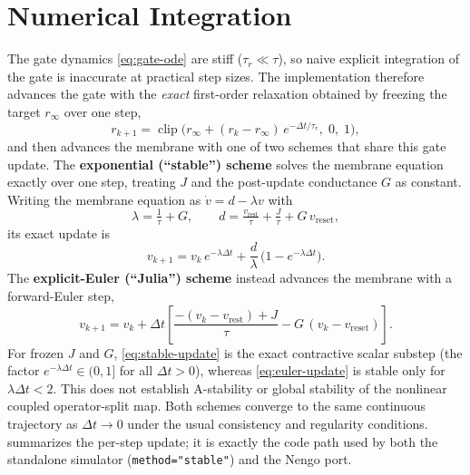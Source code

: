 \documentclass[journal]{IEEEtran}
\newcommand{\vr}{v_{\mathrm{rest}}}
\newcommand{\vre}{v_{\mathrm{reset}}}
\newcommand{\rinf}{r_{\infty}}
\newcommand{\code}[1]{\texttt{#1}}
\begin{document}
\section{Numerical Integration}\label{sec:integration}
The gate dynamics \cref{eq:gate-ode} are stiff ($\tau_r\ll\tau$), so naive
explicit integration of the gate is inaccurate at practical step sizes. The
implementation therefore advances the gate with the \emph{exact} first-order
relaxation obtained by freezing the target $\rinf$ over one step,
\begin{equation}
  r_{k+1} = \operatorname{clip}\!\Big(\rinf + (r_k-\rinf)\,e^{-\Delta t/\tau_r},
  \; 0,\; 1\Big), \label{eq:gate-update}
\end{equation}
and then advances the membrane with one of two schemes that share this gate
update. The \textbf{exponential (``stable'') scheme} solves the membrane
equation exactly over one step, treating $J$ and the post-update conductance
$G$ as constant. Writing the membrane equation as $\dot v = d - \lambda v$ with
\begin{equation}
  \lambda = \tfrac{1}{\tau} + G, \qquad
  d = \tfrac{\vr}{\tau} + \tfrac{J}{\tau} + G\,\vre,
  \label{eq:lambda-drive}
\end{equation}
its exact update is
\begin{equation}
  v_{k+1} = v_k\,e^{-\lambda\Delta t}
            + \frac{d}{\lambda}\,\big(1-e^{-\lambda\Delta t}\big).
  \label{eq:stable-update}
\end{equation}
The \textbf{explicit-Euler (``Julia'') scheme} instead advances the membrane
with a forward-Euler step,
\begin{equation}
  v_{k+1} = v_k + \Delta t\!\left[\frac{-(v_k-\vr)+J}{\tau} - G\,(v_k-\vre)\right].
  \label{eq:euler-update}
\end{equation}
For frozen $J$ and $G$, \cref{eq:stable-update} is the exact contractive scalar
substep (the factor $e^{-\lambda\Delta t}\in(0,1]$ for all $\Delta t>0$),
whereas \cref{eq:euler-update} is stable only for $\lambda\Delta t<2$. This
does not establish A-stability or global stability of the nonlinear coupled
operator-split map. Both schemes converge to the same continuous trajectory as
$\Delta t\to 0$ under the usual consistency and regularity conditions.
 summarizes the per-step update; it is exactly the code path used
by both the standalone simulator (\code{method="stable"}) and the Nengo port.
\end{document}
